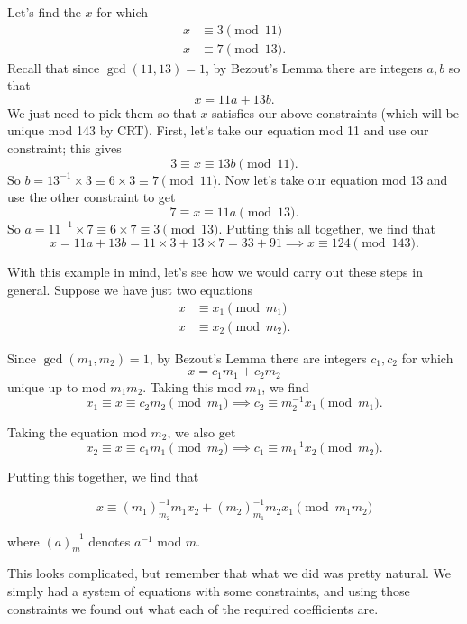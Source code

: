 \documentclass[11 pt]{scrartcl}
\begin{document}
\begin{example}[Dis 3B \#3]
    Let's find the $x$ for which 
    \begin{align*}
        x&\equiv 3 \pmod{11} \\ 
        x&\equiv 7 \pmod{13}.
    \end{align*}
    Recall that since $\gcd(11,13) = 1$, by Bezout's Lemma there are integers $a,b$ so that
    \[ x = 11a + 13b.\]
    We just need to pick them so that $x$ satisfies our above constraints (which will be unique mod 143 by CRT). First, let's take our equation mod 11 and use our constraint; this gives 
    \[ 3\equiv x \equiv 13b \pmod{11}.\] 
    So $b = 13^{-1}\times 3 \equiv 6\times 3 \equiv 7 \pmod{11}$. Now let's take our equation mod 13 and use the other constraint to get 
    \[ 7\equiv x \equiv 11a \pmod{13}.\] 
    So $a = 11^{-1}\times 7 \equiv 6\times 7 \equiv 3\pmod{13}$. Putting this all together, we find that 
    \[ x = 11a + 13b = 11\times 3 + 13\times 7 = 33 + 91 \implies  \boxed{x \equiv 124 \pmod{143}}.\] 
\end{example}

With this example in mind, let's see how we would carry out these steps in general. Suppose we have just two equations
    \begin{align*}
        x &\equiv x_1 \pmod{m_1} \\ 
        x &\equiv x_2 \pmod{m_2}.
    \end{align*}

    Since $\gcd(m_1, m_2) = 1$, by Bezout's Lemma there are integers $c_1, c_2$ for which 
    \[ x = c_1m_1 + c_2m_2\] 
    unique up to mod $m_1m_2$. Taking this mod $m_1$, we find 
    \[ x_1 \equiv x \equiv  c_2m_2 \pmod{m_1} \implies c_2 \equiv m_2^{-1} x_1 \pmod{m_1}.\]

    Taking the equation mod $m_2$, we also get 
    \[ x_2 \equiv x \equiv  c_1m_1 \pmod{m_2} \implies c_1 \equiv m_1^{-1} x_2 \pmod{m_2}.\]

    Putting this together, we find that 

    \[ \boxed{x \equiv (m_1)^{-1}_{m_2}m_1 x_2 + (m_2)^{-1}_{m_1}m_2 x_1 \pmod{m_1m_2}}\] 

    where $(a)^{-1}_m$ denotes $a^{-1}$ mod $m$. 

    This looks complicated, but remember that what we did was pretty natural. We simply had a system of equations with some constraints, and using those constraints we found out what each of the required coefficients are. 
\end{document}

